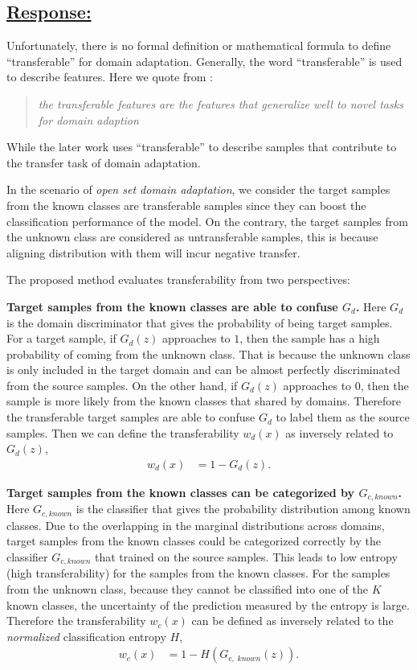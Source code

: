 \subsection*{\underline{\textbf{Response:}}}

Unfortunately, there is no formal definition or mathematical formula to define ``transferable'' for domain adaptation.
Generally, the word ``transferable'' is used to describe features.
Here we quote from \cite{DeepAdaptationNetworks}:
\begin{quote}
    \textit{the transferable features are the features that generalize well to novel tasks for domain adaption}
\end{quote}
While the later work \cite{TransferableAttentionDA} uses ``transferable'' to describe samples that contribute to the transfer task of domain adaptation.

In the scenario of \textit{open set domain adaptation}, we consider the target samples from the known classes are transferable samples since they can boost the classification performance of the model.
On the contrary, the target samples from the unknown class are considered as untransferable samples, this is because aligning distribution with them will incur negative transfer.

The proposed method evaluates transferability from two perspectives:

\textbf{Target samples from the known classes are able to confuse $G_d$.}
Here $G_d$ is the domain discriminator that gives the probability of being target samples.
For a target sample, if $G_d(z)$ approaches to $1$, then the sample has a high probability of coming from the unknown class.
That is because the unknown class is only included in the target domain and can be almost perfectly discriminated from the source samples.
On the other hand, if $G_d(z)$ approaches to $0$, then the sample is more likely from the known classes that shared by domains.
Therefore the transferable target samples are able to confuse $G_d$ to label them as the source samples.
Then we can define the transferability $w_d(x)$ as inversely related to $G_d(z)$,
\begin{align}
    w_d(x) &= 1-G_d(z). \label{eq: domain transferability}
\end{align}

\textbf{Target samples from the known classes can be categorized by $G_{c, known}$.}
Here $G_{c, known}$ is the classifier that gives the probability distribution among known classes.
Due to the overlapping in the marginal distributions across domains, target samples from the known classes could be categorized correctly by the classifier $G_{c, known}$ that trained on the source samples. 
This leads to low entropy (high transferability) for the samples from the known classes.
For the samples from the unknown class, because they cannot be classified into one of the $K$ known classes, the uncertainty of the prediction measured by the entropy is large.
Therefore the transferability $w_c(x)$ can be defined as inversely related to the \textit{normalized} classification entropy $H$,
\begin{align}
    w_c(x) &=1-H(G_{c,\; known}(z)). \label{eq: class transferability}
\end{align}

